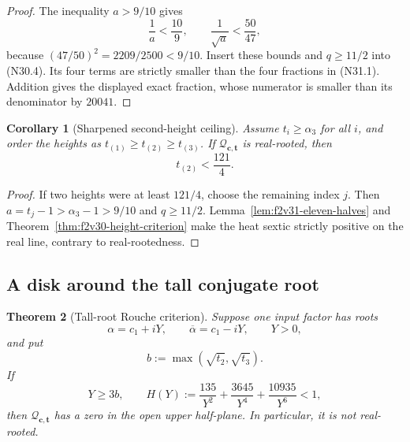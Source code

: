 \documentclass[11pt]{article}
\newtheorem{theorem}{Theorem}[section]
\newtheorem{corollary}[theorem]{Corollary}
\theoremstyle{definition}
\theoremstyle{remark}
\begin{document}
\begin{proof}
The inequality \(a>9/10\) gives
\[
 \frac1a<\frac{10}{9},\qquad
 \frac1{\sqrt a}<\frac{50}{47},
 \tag{N31.2}
\]
because \((47/50)^2=2209/2500<9/10\).
Insert these bounds and \(q\geq11/2\) into
\textup{(N30.4)}.  Its four terms are strictly smaller than the four
fractions in \textup{(N31.1)}.  Addition gives the displayed exact
fraction, whose numerator is smaller than its denominator by \(20041\).
\end{proof}

\begin{corollary}[Sharpened second-height ceiling]
\label{cor:f2v31-second-height}
Assume \(t_i\geq\alpha_3\) for all \(i\), and order the heights as
\(t_{(1)}\geq t_{(2)}\geq t_{(3)}\).  If
\(\mathcal Q_{\bm c,\bm t}\) is real-rooted, then
\[
 \boxed{t_{(2)}<\frac{121}{4}.}
 \tag{N31.3}
\]
\end{corollary}

\begin{proof}
If two heights were at least \(121/4\), choose the remaining index \(j\).
Then \(a=t_j-1>\alpha_3-1>9/10\) and
\(q\geq11/2\).  Lemma~\ref{lem:f2v31-eleven-halves} and
Theorem~\ref{thm:f2v30-height-criterion} make the heat sextic strictly
positive on the real line, contrary to real-rootedness.
\end{proof}

\subsection{A disk around the tall conjugate root}

\begin{theorem}[Tall-root Rouche criterion]
\label{thm:f2v31-rouche}
Suppose one input factor has roots
\[
 \alpha=c_1+iY,\qquad \overline\alpha=c_1-iY,\qquad Y>0,
 \tag{N31.4}
\]
and put
\[
 b:=\max(\sqrt{t_2},\sqrt{t_3}).
 \tag{N31.5}
\]
If
\[
 Y\geq3b,\qquad
 H(Y):=\frac{135}{Y^2}+\frac{3645}{Y^4}
       +\frac{10935}{Y^6}<1,
 \tag{N31.6}
\]
then \(\mathcal Q_{\bm c,\bm t}\) has a zero in the open upper
half-plane.  In particular, it is not real-rooted.
\end{theorem}
\end{document}
